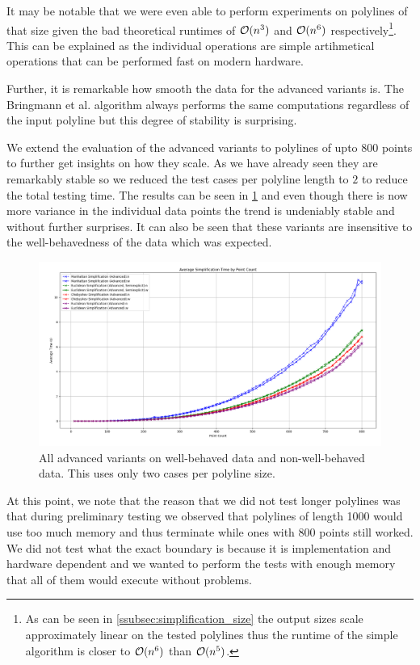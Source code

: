 It may be notable that we were even able to perform experiments on polylines of that size given the bad theoretical runtimes of \(\mathcal{O}(n^3)\) and \(\mathcal{O}(n^6)\) respectively\footnote{As can be seen in \cref{ssubsec:simplification_size} the output sizes scale approximately linear on the tested polylines thus the runtime of the simple algorithm is closer to \(\mathcal{O}(n^6)\) than \(\mathcal{O}(n^5)\).}. This can be explained as the individual operations are simple artihmetical operations that can be performed fast on modern hardware.

Further, it is remarkable how smooth the data for the advanced variants is. The Bringmann et al. algorithm always performs the same computations regardless of the input polyline but this degree of stability is surprising. 

We extend the evaluation of the advanced variants to polylines of upto 800 points to further get insights on how they scale. As we have already seen they are remarkably stable so we reduced the test cases per polyline length to \(2\) to reduce the total testing time. The results can be seen in \cref{fig:res_advanced800} and even though there is now more variance in the individual data points the trend is undeniably stable and without further surprises. It can also be seen that these variants are insensitive to the well-behavedness of the data which was expected. 

\begin{figure}[b]
  \centering
	\includegraphics[scale=0.4]{./figures/res_advanced800.png}
  \caption{All advanced variants on well-behaved data and non-well-behaved data. This uses only two cases per polyline size.}
  \label{fig:res_advanced800}
\end{figure}

At this point, we note that the reason that we did not test longer polylines was that during preliminary testing we observed that polylines of length 1000 would use too much memory and thus terminate while ones with 800 points still worked. We did not test what the exact boundary is because it is implementation and hardware dependent and we wanted to perform the tests with enough memory that all of them would execute without problems. 

